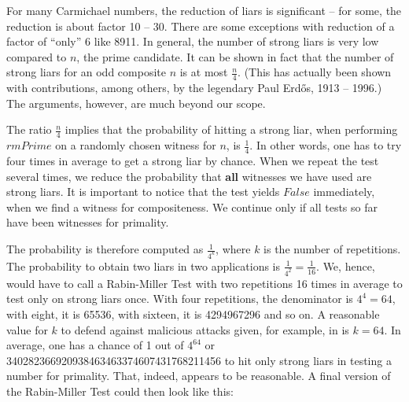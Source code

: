 \documentclass{scrreprt}
\newcommand{\Conid}[1]{\mathit{#1}}
\newcommand{\Varid}[1]{\mathit{#1}}
\begin{document}
For many Carmichael numbers, the reduction of liars is significant --
for some, the reduction is about factor 10 -- 30. There are some exceptions
with reduction of a factor of ``only'' 6 like \num{8911}.
In general, the number of strong liars is very low compared to $n$,
the prime candidate.
It can be shown in fact that the number of strong liars
for an odd composite $n$ is at most $\frac{n}{4}$.
(This has actually been shown with contributions,
among others, by the legendary Paul Erd\H{o}s, 1913 -- 1996.)
The arguments, however, are much beyond our scope.

The ratio $\frac{n}{4}$ implies that
the probability of hitting a strong liar, when performing \ensuremath{\Varid{rmPrime}}
on a randomly chosen witness for $n$, is $\frac{1}{4}$.
In other words, one has to try four times in average 
to get a strong liar by chance.
When we repeat the test several times,
we reduce the probability that \textbf{all} witnesses
we have used are strong liars.
It is important to notice that the test yields \ensuremath{\Conid{False}} immediately,
when we find a witness for compositeness.
We continue only if all tests so far have been
witnesses for primality.

The probability is therefore computed as
$\frac{1}{4^k}$, where $k$ is the number of repetitions.
The probability to obtain two liars in two applications
is $\frac{1}{4^2} = \frac{1}{16}$.
We, hence, would have to call a Rabin-Miller Test
with two repetitions 16 times in average
to test only on strong liars once.
With four repetitions, the denominator is $4^4 = 64$,
with eight, it is \num{65536},
with sixteen, it is \num{4294967296} and so on.
A reasonable value for $k$ to defend against
malicious attacks given, for example,
in  is $k=64$.
In average, one has a chance of 1 out of $4^{64}$ or
\num{340282366920938463463374607431768211456}
to hit only strong liars in testing a number for primality.
That, indeed, appears to be reasonable.
A final version of the Rabin-Miller Test could then look like 
this:
\end{document}
